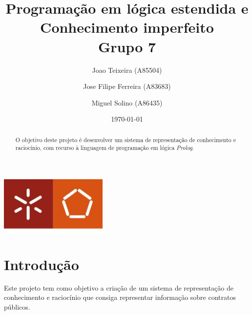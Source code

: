 \documentclass[a4paper]{report}
\begin{document}
\title{Programação em lógica estendida e Conhecimento imperfeito \\
\large Grupo 7}
\author{Joao Teixeira (A85504) \and Jose Filipe Ferreira (A83683) \and Miguel
Solino (A86435)}
\date{\today}

\begin{center}
    \begin{minipage}{0.75\linewidth}
        \centering
        \includegraphics[width=0.4\textwidth]{eng.jpeg}\par\vspace{1cm}
        \vspace{1.5cm}
        \href{https://www.uminho.pt/PT}
        {\color{black}{\scshape\LARGE Universidade do Minho}} \par
        \vspace{1cm}
        \href{https://www.di.uminho.pt/}
        {\color{black}{\scshape\Large Departamento de Informática}} \par
        \vspace{1.5cm}
        \maketitle
    \end{minipage}
\end{center}

\begin{abstract}
    \begin{center}
        O objetivo deste projeto é desenvolver um sistema de representação de
        conhecimento e raciocínio, com recurso à linguagem de programação em
        lógica \textit{Prolog}.
    \end{center}
\end{abstract}

\tableofcontents

\pagebreak

\chapter{Introdução}
Este projeto tem como objetivo a criação de um sistema de representação de
conhecimento e raciocínio que consiga representar informação sobre contratos
públicos.
\end{document}
